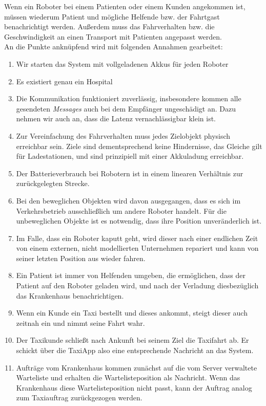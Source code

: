 Wenn ein Roboter bei einem Patienten oder einem Kunden angekommen ist, müssen wiederum Patient und mögliche Helfende bzw. der Fahrtgast benachrichtigt werden. Außerdem muss das Fahrverhalten bzw. die Geschwindigkeit an einen Transport mit Patienten angepasst werden.\\

An die Punkte anknüpfend wird mit folgenden Annahmen gearbeitet:
\begin{enumerate}
	\item Wir starten das System mit vollgeladenen Akkus für jeden Roboter
	\item Es existiert genau ein Hospital
	\item Die Kommunikation funktioniert zuverlässig, insbesondere kommen alle gesendeten \textit{Messages} auch bei dem Empfänger ungeschädigt an. Dazu nehmen wir auch an, dass die Latenz vernachlässigbar klein ist.
	\item Zur Vereinfachung des Fahrverhalten muss jedes Zielobjekt physisch erreichbar sein. Ziele sind dementsprechend keine Hindernisse, das Gleiche gilt für Ladestationen, und sind prinzipiell mit einer Akkuladung erreichbar.
	\item Der Batterieverbrauch bei Robotern ist in einem linearen Verhältnis zur zurückgelegten Strecke.
	\item Bei den beweglichen Objekten wird davon ausgegangen, dass es sich im Verkehrsbetrieb ausschließlich um andere Roboter handelt. 
	Für die unbeweglichen Objekte ist es notwendig, dass ihre Position unveränderlich ist.
	\item Im Falle, dass ein Roboter kaputt geht, wird dieser nach einer endlichen Zeit von einem externen, nicht modellierten Unternehmen repariert und kann von seiner letzten Position aus wieder fahren.
	\item Ein Patient ist immer von Helfenden umgeben, die ermöglichen, dass der Patient auf den Roboter geladen wird, und nach der Verladung diesbezüglich das Krankenhaus benachrichtigen.
	\item Wenn ein Kunde ein Taxi bestellt und dieses ankommt, steigt dieser auch zeitnah ein und nimmt seine Fahrt wahr.
	\item Der Taxikunde schließt nach Ankunft bei seinem Ziel die Taxifahrt ab. Er schickt über die TaxiApp also eine entsprechende Nachricht an das System.
	\item Aufträge vom Krankenhaus kommen zunächst auf die vom Server verwaltete Warteliste und erhalten die Wartelisteposition als Nachricht. Wenn das Krankenhaus diese Wartelisteposition nicht passt, kann der Auftrag analog zum Taxiauftrag zurückgezogen werden.

\end{enumerate}

